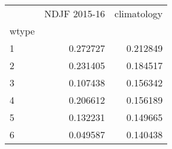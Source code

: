 \begin{tabular}{lrr}
\toprule
{} &  NDJF 2015-16 &  climatology \\
wtype &               &              \\
\midrule
1     &      0.272727 &     0.212849 \\
2     &      0.231405 &     0.184517 \\
3     &      0.107438 &     0.156342 \\
4     &      0.206612 &     0.156189 \\
5     &      0.132231 &     0.149665 \\
6     &      0.049587 &     0.140438 \\
\bottomrule
\end{tabular}
